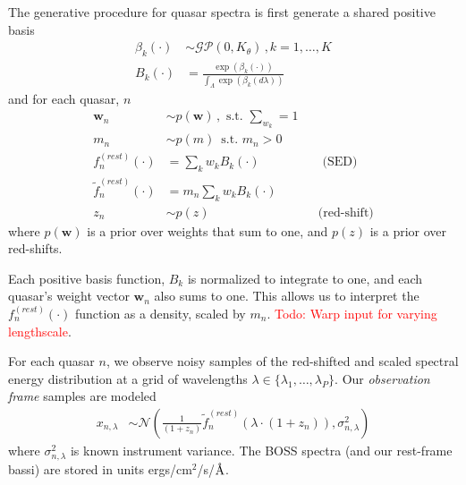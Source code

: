 \documentclass{article}
\newcommand{\angstrom}{\textup{\AA}}
\newcommand{\red}[1]{\textcolor{red}{#1}}
\begin{document}
The generative procedure for quasar spectra is first generate a shared positive basis
\begin{align}
  \beta_k(\cdot) &\sim \mathcal{GP}(0, K_\theta) \, , k=1, \dots, K\\
  B_k(\cdot) &= \frac{\exp(\beta_k(\cdot))}{\int_\Lambda \exp(\beta_k(d \lambda))}   
\end{align}
and for each quasar, $n$
\begin{align}
  \mathbf{w}_n &\sim p(\mathbf{w}) \, , \text{ s.t. } \sum_{w_k} = 1  \\
  m_n  &\sim p(m) \, \text{ s.t. } m_n > 0 \\
  f^{(rest)}_n(\cdot) &= \sum_{k} w_k B_k(\cdot) &&\text{ (SED) }\\
  \tilde f^{(rest)}_n(\cdot) &= m_n \sum_{k} w_k B_k(\cdot) \\
  z_n &\sim p(z) &&\text{(red-shift)}
\end{align}
where $p(\mathbf{w})$ is a prior over weights that sum to one, and $p(z)$ is a prior over red-shifts. 

Each positive basis function, $B_k$ is normalized to integrate to one, and each quasar's weight vector $\mathbf{w}_n$ also sums to one.  This allows us to interpret the $f^{(rest)}_n(\cdot)$ function as a density, scaled by $m_n$. 
\red{Todo: Warp input for varying lengthscale}.  

For each quasar $n$, we observe noisy samples of the red-shifted and scaled spectral energy distribution at a grid of wavelengths $\lambda \in \{\lambda_1, \dots, \lambda_P \}$.  Our \emph{observation frame} samples are modeled
\begin{align}
  x_{n, \lambda} 
    &\sim \mathcal{N}\left( \frac{1}{(1 + z_n)} \tilde f_n^{(rest)}( \lambda \cdot (1 + z_n) ), \sigma_{n,\lambda}^2 \right)
    \label{eq:spec} 
\end{align}
where $\sigma_{n, \lambda}^2$ is known instrument variance. The BOSS spectra (and our rest-frame bassi) are stored in units ergs/cm$^2$/s/$\angstrom$. 
\end{document}
